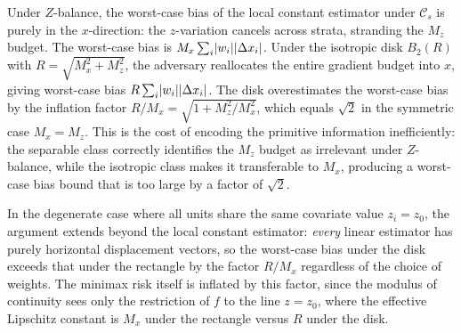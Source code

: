 \begin{remark}\label{rem:isotropy_zbalance}
	Under $Z$-balance, the worst-case bias of the local constant estimator under $\mathcal{C}_s$ is purely in the $x$-direction: the $z$-variation cancels across strata, stranding the $M_z$ budget.
	The worst-case bias is $M_x \sum_i \lvert w_i\rvert \lvert\Delta x_i\rvert$.
	Under the isotropic disk $B_2(R)$ with $R = \sqrt{M_x^2 + M_z^2}$, the adversary reallocates the entire gradient budget into $x$, giving worst-case bias $R \sum_i \lvert w_i\rvert \lvert\Delta x_i\rvert$.
	The disk overestimates the worst-case bias by the inflation factor $R / M_x = \sqrt{1 + M_z^2 / M_x^2}$, which equals $\sqrt{2}$ in the symmetric case $M_x = M_z$.
	This is the cost of encoding the primitive information inefficiently: the separable class correctly identifies the $M_z$ budget as irrelevant under $Z$-balance, while the isotropic class makes it transferable to $M_x$, producing a worst-case bias bound that is too large by a factor of $\sqrt{2}$.

	In the degenerate case where all units share the same covariate value $z_i = z_0$, the argument extends beyond the local constant estimator: \emph{every} linear estimator has purely horizontal displacement vectors, so the worst-case bias under the disk exceeds that under the rectangle by the factor $R / M_x$ regardless of the choice of weights.
	The minimax risk itself is inflated by this factor, since the modulus of continuity sees only the restriction of $f$ to the line $z = z_0$, where the effective Lipschitz constant is $M_x$ under the rectangle versus $R$ under the disk.
\end{remark}

